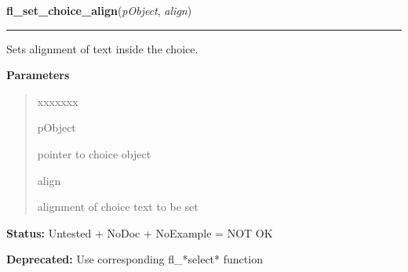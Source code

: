 \hspace{.8\funcindent}\begin{boxedminipage}{\funcwidth}

    \raggedright \textbf{fl\_set\_choice\_align}(\textit{pObject}, \textit{align})

    \vspace{-1.5ex}

    \rule{\textwidth}{0.5\fboxrule}
\setlength{\parskip}{2ex}
    Sets alignment of text inside the choice.

\setlength{\parskip}{1ex}
      \textbf{Parameters}
      \vspace{-1ex}

      \begin{quote}
        \begin{Ventry}{xxxxxxx}

          \item[pObject]

          pointer to choice object

          \item[align]

          alignment of choice text to be set

        \end{Ventry}

      \end{quote}

\textbf{Status:} Untested + NoDoc + NoExample = NOT OK



\textbf{Deprecated:} Use corresponding fl\_*select* function



    \end{boxedminipage}

    \label{xformslib:library:fl_get_choice_item_mode}

    \vspace{0.5ex}

